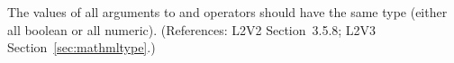 The values of all arguments to  and 
operators should have the same type (either all boolean or all
numeric).   (References: L2V2 Section~3.5.8; L2V3
Section~\ref{sec:mathmltype}.)
